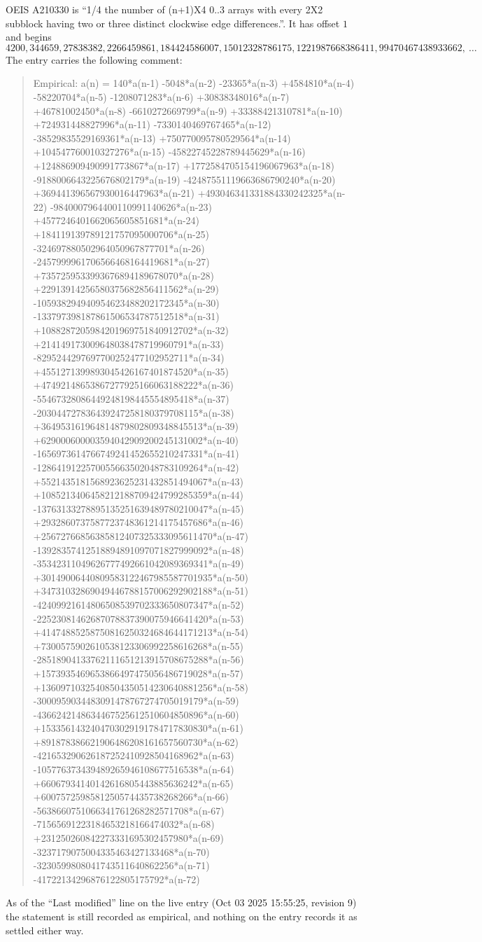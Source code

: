 \documentclass[11pt,a4paper]{article}
\theoremstyle{plain}
\theoremstyle{definition}
\begin{document}
OEIS A210330 is ``1/4 the number of (n+1)X4 0..3 arrays with every 2X2 subblock having two or three distinct clockwise edge differences.''. It has offset $1$ and begins
\[
4200, 344659, 27838382, 2266459861, 184424586007, 15012328786175, 1221987668386411, 99470467438933662,\ \dots
\]
The entry carries the following comment:
\begin{quote}\small
Empirical: a(n) = 140*a(n-1) -5048*a(n-2) -23365*a(n-3) +4584810*a(n-4) -58220704*a(n-5) -1208071283*a(n-6) +30838348016*a(n-7) +46781002450*a(n-8) -6610272669799*a(n-9) +33388421310781*a(n-10) +724931448827996*a(n-11) -7330140469767465*a(n-12) -38529835529169361*a(n-13) +750770095780529564*a(n-14) +104547760010327276*a(n-15) -45822745228789445629*a(n-16) +124886909490991773867*a(n-17) +1772584705154196067963*a(n-18) -9188006643225676802179*a(n-19) -42487551119663686790240*a(n-20) +369441396567930016447963*a(n-21) +493046341331884330242325*a(n-22) -9840007964400110991140626*a(n-23) +4577246401662065605851681*a(n-24) +184119139789121757095000706*a(n-25) -324697880502964050967877701*a(n-26) -2457999961706566468164419681*a(n-27) +7357259533993676894189678070*a(n-28) +22913914256580375682856411562*a(n-29) -105938294940954623488202172345*a(n-30) -133797398187861506534787512518*a(n-31) +1088287205984201969751840912702*a(n-32) +214149173009648038478719960791*a(n-33) -8295244297697700252477102952711*a(n-34) +4551271399893045426167401874520*a(n-35) +47492148653867277925166063188222*a(n-36) -55467328086449248198445554895418*a(n-37) -203044727836439247258180379708115*a(n-38) +364953161964814879802809348845513*a(n-39) +629000600003594042909200245131002*a(n-40) -1656973614766749241452655210247331*a(n-41) -1286419122570055663502048783109264*a(n-42) +5521435181568923625231432851494067*a(n-43) +1085213406458212188709424799285359*a(n-44) -13763133278895135251639489780210047*a(n-45) +2932860737587723748361214175457686*a(n-46) +25672766856385812407325333095611470*a(n-47) -13928357412518894891097071827999092*a(n-48) -35342311049626777492661042089369341*a(n-49) +30149006440809583122467985587701935*a(n-50) +34731032869049446788157006292902188*a(n-51) -42409921614806508539702333650807347*a(n-52) -22523081462687078837390075946641420*a(n-53) +41474885258750816250324684644171213*a(n-54) +7300575902610538123306992258616268*a(n-55) -28518904133762111651213915708675288*a(n-56) +1573935469653866497475056486719028*a(n-57) +13609710325408504350514230640881256*a(n-58) -3000959034483091478767274705019179*a(n-59) -4366242148634467525612510604850896*a(n-60) +1533561432404703029191784717830830*a(n-61) +891878386621906486208161657560730*a(n-62) -421653290626187252410928504168962*a(n-63) -105776373439489265946108677516538*a(n-64) +66067934140142616805443885636242*a(n-65) +6007572598581250574435738268266*a(n-66) -5638660751066341761268282571708*a(n-67) -71565691223184653218166474032*a(n-68) +231250260842273331695302457980*a(n-69) -3237179075004335463427133468*a(n-70) -3230599808041743511640862256*a(n-71) -41722134296876122805175792*a(n-72)
\end{quote}
As of the ``Last modified'' line on the live entry (Oct 03 2025 15:55:25, revision 9) the statement is
still recorded as empirical, and nothing on the entry records it as settled either way.
\end{document}
